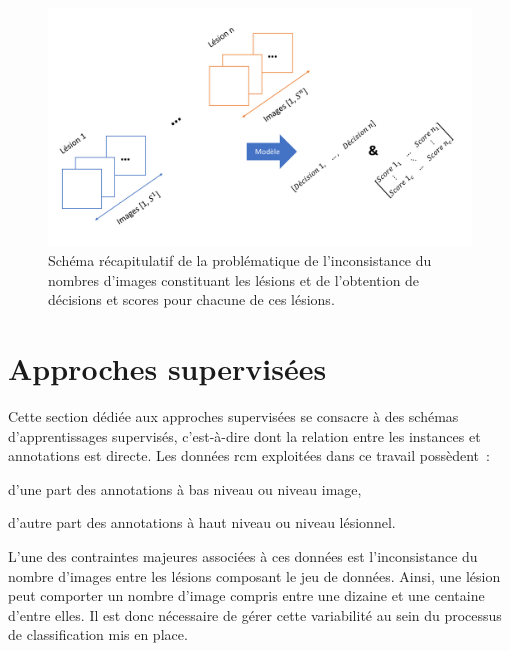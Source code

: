 \begin{figure}[H]
    \centering
    \includegraphics[width=0.65\linewidth]{contents/chapter_6/resources/scheme_patient_decision_objectives.pdf}
    \caption{Schéma récapitulatif de la problématique de l'inconsistance du nombres d'images constituant les lésions et de l'obtention de décisions et scores pour chacune de ces lésions.}
    \label{fig:scheme_patient_decision_objectives}
\end{figure}\par
\clearpage

\section{Approches supervisées}
\label{sec:patient_decision_supervised}
Cette section dédiée aux approches supervisées se consacre à des schémas d'apprentissages supervisés, c'est-à-dire dont la relation entre les instances et annotations est directe. Les données \gls{rcm} exploitées dans ce travail possèdent~:
\begin{inlinerate}
    \item d'une part des annotations à bas niveau ou niveau image,
    \item d'autre part des annotations à haut niveau ou niveau lésionnel. 
\end{inlinerate} L'une des contraintes majeures associées à ces données est l'inconsistance du nombre d'images entre les lésions composant le jeu de données. Ainsi, une lésion peut comporter un nombre d'image compris entre une dizaine et une centaine d'entre elles. Il est donc nécessaire de gérer cette variabilité au sein du processus de classification mis en place.\par

